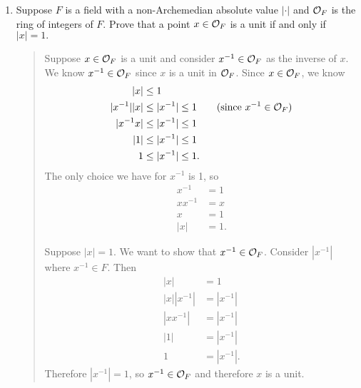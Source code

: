 \documentclass{hw}
\begin{document}
    \begin{enumerate}
        \item Suppose $F$ is a field with a non-Archemedian absolute value $|\cdot|$ and $\mathcal{O}_{F}$ is the ring of
        integers of $F$. Prove that a point $x\in\mathcal{O}_{F}$ is a unit if and only if $|x|=1.$
        \begin{quote}
            Suppose $x\in\mathcal{O}_{F}$ is a unit and consider $x^{-1}\in\mathcal{O}_{F}$ as the inverse of $x$. We know
            $x^{-1}\in\mathcal{O}_{F}$ since $x$ is a unit in $\mathcal{O}_{F}$. Since $x\in\mathcal{O}_{F}$, we know
            \begin{align*}
                |x| &\leq 1\\
                |x^{-1}||x| &\leq |x^{-1}|\leq1 \qquad\text{(since $x^{-1}\in\mathcal{O}_{F}$)}\\
                |x^{-1}x| &\leq |x^{-1}|\leq1\\
                |1| &\leq |x^{-1}| \leq1\\
                1 &\leq |x^{-1}| \leq 1.
            \end{align*}
            The only choice we have for $x^{-1}$ is 1, so
            \begin{align*}
                x^{-1} &= 1\\
                xx^{-1}&= x\\
                x&=1\\
                |x|&=1.
            \end{align*}

            Suppose $|x| = 1$. We want to show that $x^{-1}\in\mathcal{O}_{F}$. Consider $|x^{-1}|$ where $x^{-1}\in F$.
            Then
            \begin{align*}
                |x|&=1\\
                |x||x^{-1}| &= |x^{-1}|\\
                |xx^{-1}| &= |x^{-1}|\\
                |1| &= |x^{-1}|\\
                1 &= |x^{-1}|.
            \end{align*}
            Therefore $|x^{-1}|=1$, so $x^{-1}\in\mathcal{O}_{F}$ and therefore $x$ is a unit. 
        \end{quote}


\end{enumerate}
\end{document}
